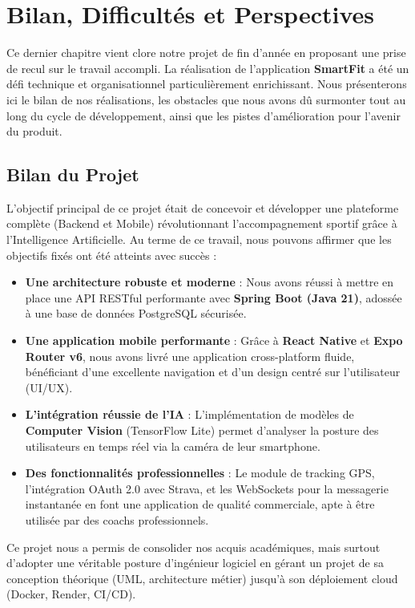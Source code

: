 \chapter{Bilan, Difficultés et Perspectives}

Ce dernier chapitre vient clore notre projet de fin d'année en proposant une prise de recul sur le travail accompli. La réalisation de l'application \textbf{SmartFit} a été un défi technique et organisationnel particulièrement enrichissant. Nous présenterons ici le bilan de nos réalisations, les obstacles que nous avons dû surmonter tout au long du cycle de développement, ainsi que les pistes d'amélioration pour l'avenir du produit.

\section{Bilan du Projet}
L'objectif principal de ce projet était de concevoir et développer une plateforme complète (Backend et Mobile) révolutionnant l'accompagnement sportif grâce à l'Intelligence Artificielle. Au terme de ce travail, nous pouvons affirmer que les objectifs fixés ont été atteints avec succès :

\begin{itemize}
    \item \textbf{Une architecture robuste et moderne} : Nous avons réussi à mettre en place une API RESTful performante avec \textbf{Spring Boot (Java 21)}, adossée à une base de données PostgreSQL sécurisée.
    \item \textbf{Une application mobile performante} : Grâce à \textbf{React Native} et \textbf{Expo Router v6}, nous avons livré une application cross-platform fluide, bénéficiant d'une excellente navigation et d'un design centré sur l'utilisateur (UI/UX).
    \item \textbf{L'intégration réussie de l'IA} : L'implémentation de modèles de \textbf{Computer Vision} (TensorFlow Lite) permet d'analyser la posture des utilisateurs en temps réel via la caméra de leur smartphone.
    \item \textbf{Des fonctionnalités professionnelles} : Le module de tracking GPS, l'intégration OAuth 2.0 avec Strava, et les WebSockets pour la messagerie instantanée en font une application de qualité commerciale, apte à être utilisée par des coachs professionnels.
\end{itemize}

Ce projet nous a permis de consolider nos acquis académiques, mais surtout d'adopter une véritable posture d'ingénieur logiciel en gérant un projet de sa conception théorique (UML, architecture métier) jusqu'à son déploiement cloud (Docker, Render, CI/CD).

